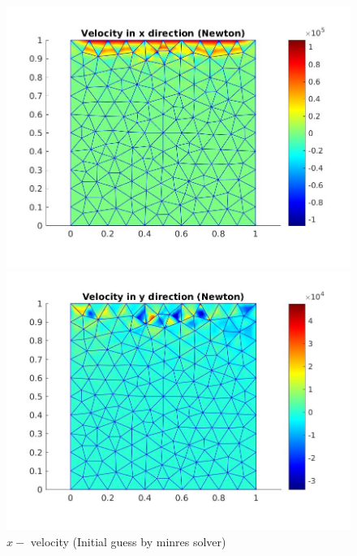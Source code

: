 \documentclass[a4paper]{book}
\begin{document}
\begin{figure}
  \begin{minipage}[c]{0.67\textwidth}
    \includegraphics[width=\textwidth]{lid_newton_vx_minres.jpg}
  \end{minipage}\hfill
  \begin{minipage}[c]{0.3\textwidth}
    \caption{$x-$ velocity (Initial guess by minres solver)}
  \label{x_vel_navier_stoke_minres_lid}
  \end{minipage}
  \begin{minipage}[c]{0.67\textwidth}
    \includegraphics[width=\textwidth]{lid_newton_vy_minres.jpg}
  \end{minipage}\hfill
  \begin{minipage}[c]{0.3\textwidth}

\end{minipage}
\end{figure}
\end{document}
